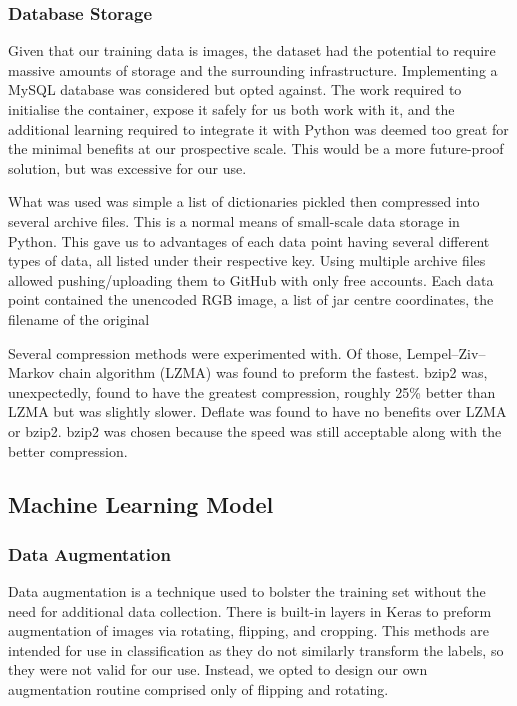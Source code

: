 \documentclass[11pt]{article}
\begin{document}
            \subsubsection{Database Storage}
                Given that our training data is images, the dataset had the potential to require massive amounts of storage and the surrounding infrastructure. Implementing a MySQL database was considered but opted against. The work required to initialise the container, expose it safely for us both work with it, and the additional learning required to integrate it with Python was deemed too great for the minimal benefits at our prospective scale. This would be a more future-proof solution, but was excessive for our use.

                What was used was simple a list of dictionaries pickled then compressed into several archive files. This is a normal means of small-scale data storage in Python. This gave us to advantages of each data point having several different types of data, all listed under their respective key. Using multiple archive files allowed pushing/uploading them to GitHub with only free accounts. Each data point contained the unencoded RGB image, a list of jar centre coordinates, the filename of the original
                
                Several compression methods were experimented with. Of those, Lempel–Ziv–Markov chain algorithm (LZMA) was found to preform the fastest. bzip2 was, unexpectedly, found to have the greatest compression, roughly 25\% better than LZMA but was slightly slower. Deflate was found to have no benefits over LZMA or bzip2. bzip2 was chosen because the speed was still acceptable along with the better compression.

        \subsection{Machine Learning Model}\label{sec:ml}
            \subsubsection{Data Augmentation}\label{sec:aug}
                Data augmentation is a technique used to bolster the training set without the need for additional data collection. There is built-in layers in Keras to preform augmentation of images via rotating, flipping, and cropping. This methods are intended for use in classification as they do not similarly transform the labels, so they were not valid for our use. Instead, we opted to design our own augmentation routine comprised only of flipping and rotating.
\end{document}
